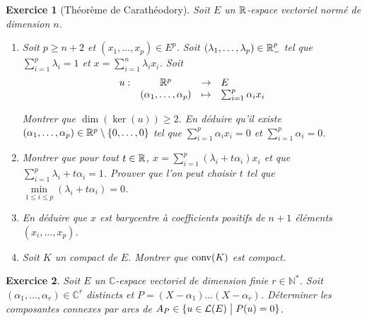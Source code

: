 \documentclass[12pt]{article}
\newtheorem{exercise}{Exercice}[section]
\theoremstyle{remark}
\theoremstyle{remark}
\newcommand{\C}{\mathbb{C}} \newcommand{\Q}{\mathbb{Q}}
\newcommand{\N}{\mathbb{N}} \newcommand{\Z}{\mathbb{Z}}
\newcommand{\function}[5]{
	$$
	\begin{array}{rccl}
		#1: & #2 & \to & #3 \\
		& #4 & \mapsto & #5
	\end{array}
	$$
}
\begin{document}
\begin{exercise}[Théorème de Carathéodory]
	Soit $E$ un $\mathbb{R}$-espace vectoriel normé de dimension $n$.
	\begin{enumerate}
		\item Soit $p\geqslant n+2$ et $(x_{1},\dots,x_{p})\in E^{p}$. Soit $(\lambda_{1},\dots,\lambda_{p})\in\mathbb{R}_{-}^{p}$ tel que $\sum_{i=1}^{p}\lambda_{i}=1$ et $x=\sum_{i=1}^{n}\lambda_{i}x_{i}$. Soit \function{u}{\R^p}{E}{(\alpha_{1},\dots,\alpha_{p})}{\sum_{i=1}^{p}\alpha_{i}x_{i}}
		Montrer que $\dim(\ker(u))\geqslant 2$. En déduire qu'il existe $(\alpha_{1},\dots,\alpha_{p})\in\mathbb{R}^{p}\setminus\{0,\dots,0\}$ tel que $\sum_{i=1}^{p}\alpha_{i}x_{i}=0$ et $\sum_{i=1}^{p}\alpha_{i}=0$.
		
		\item Montrer que pour tout $t\in\mathbb{R}$, $x=\sum_{i=1}^{p}(\lambda_{i}+t\alpha_{i})x_{i}$ et que $\sum_{i=1}^{p}\lambda_{i}+t\alpha_{i}=1$. Prouver que l'on peut choisir $t$ tel que $\min\limits_{1\leqslant i\leqslant p}(\lambda_{i}+t\alpha_{i})=0$.
		
		\item En déduire que $x$ est barycentre à coefficients positifs de $n+1$ éléments $(x_{i},\dots,x_{p})$.
		
		\item Soit $K$ un compact de $E$. Montrer que $\operatorname{conv}(K)$ est compact.
	\end{enumerate}
\end{exercise}

\begin{exercise}
	Soit $E$ un $\C$-espace vectoriel de dimension finie $r\in\N^{*}$. Soit $(\alpha_{1},\dots,\alpha_{r})\in\C^{r}$ distincts et $P=(X-\alpha_{1})\dots(X-\alpha_{r})$. Déterminer les composantes connexes par arcs de $A_{P}\in\{u\in\mathcal{L}(E)\bigm| P(u)=0\}$.
\end{exercise}
\end{document}
